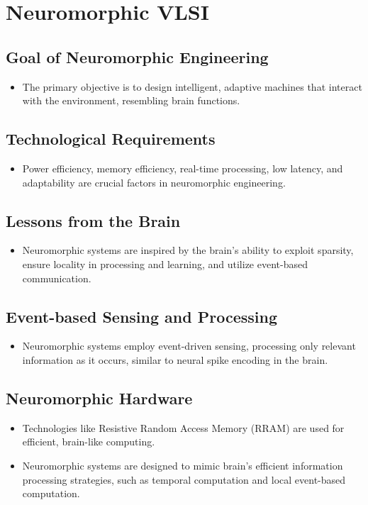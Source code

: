 \documentclass{article}
\begin{document}
\section{Neuromorphic VLSI}

\subsection{Goal of Neuromorphic Engineering}
\begin{itemize}
    \item The primary objective is to design intelligent, adaptive machines that interact with the environment, resembling brain functions.
\end{itemize}

\subsection{Technological Requirements}
\begin{itemize}
    \item Power efficiency, memory efficiency, real-time processing, low latency, and adaptability are crucial factors in neuromorphic engineering.
\end{itemize}

\subsection{Lessons from the Brain}
\begin{itemize}
    \item Neuromorphic systems are inspired by the brain's ability to exploit sparsity, ensure locality in processing and learning, and utilize event-based communication.
\end{itemize}

\subsection{Event-based Sensing and Processing}
\begin{itemize}
    \item Neuromorphic systems employ event-driven sensing, processing only relevant information as it occurs, similar to neural spike encoding in the brain.
\end{itemize}

\subsection{Neuromorphic Hardware}
\begin{itemize}
    \item Technologies like Resistive Random Access Memory (RRAM) are used for efficient, brain-like computing.
    \item Neuromorphic systems are designed to mimic brain's efficient information processing strategies, such as temporal computation and local event-based computation.
\end{itemize}
\end{document}
